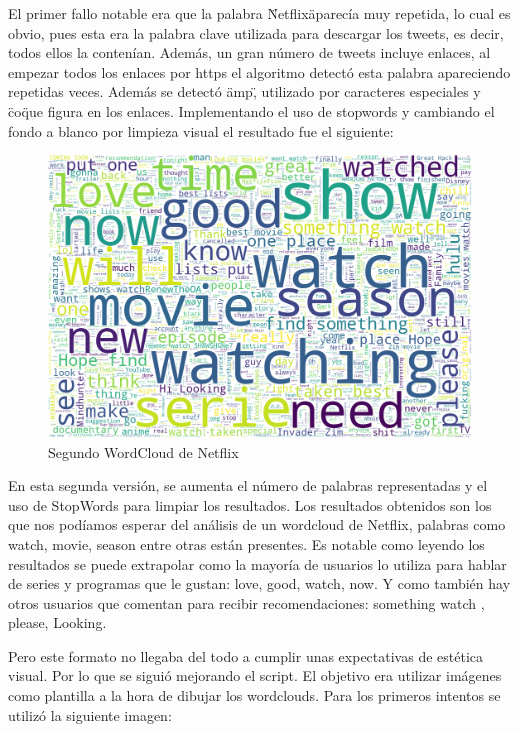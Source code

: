 El primer fallo notable era que la palabra \"Netflix\" aparecía muy repetida, lo cual es obvio, pues esta era la palabra clave utilizada para descargar los tweets, es decir, todos ellos la contenían. Además, un gran número de tweets incluye enlaces, al empezar todos los enlaces por https el algoritmo detectó esta palabra apareciendo repetidas veces. Además se detectó \"amp\", utilizado por caracteres especiales y \"co\" que figura en los enlaces. Implementando el uso de stopwords y cambiando el fondo a blanco por limpieza visual el resultado fue el siguiente: 

\begin{figure}[H]
	\centering
	\includegraphics[scale=.3]{imagenes/NetflixAll.png}
	\caption{Segundo WordCloud de Netflix}
	\label{fig:wordcloudNetflix2}
\end{figure} 
 
En esta segunda versión, se aumenta el número de palabras representadas y el uso de StopWords para limpiar los resultados. Los resultados obtenidos son los que nos podíamos esperar del análisis de un wordcloud de Netflix, palabras como watch, movie, season entre otras están presentes. Es notable como leyendo los resultados se puede extrapolar como la mayoría de usuarios lo utiliza para hablar de series y programas que le gustan: love, good, watch, now. Y como también hay otros usuarios que comentan para recibir recomendaciones: something watch ,  please, Looking. 


Pero este formato no llegaba del todo a cumplir unas expectativas de estética visual. Por lo que se siguió mejorando el script. El objetivo era utilizar imágenes como plantilla a la hora de dibujar los wordclouds. Para los primeros intentos se utilizó la siguiente imagen: 


